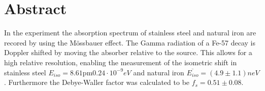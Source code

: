 \section*{Abstract}
In the experiment the absorption spectrum of stainless steel and natural iron are recored by using the Mössbauer effect. The Gamma radiation of a Fe-57 decay is Doppler shifted by moving the absorber relative to the source. This allows for a high relative resolution, enabling the measurement of the isometric shift in stainless steel $E_{iso}= \unit{8.61\pm0.24\cdot10^{-9}}{eV}$ and natural iron $\overline{E_{iso}} = \unit{(4.9\pm1.1)}{neV}$. Furthermore the Debye-Waller factor was calculated to be $f_s=0.51\pm0.08$.